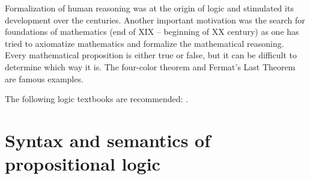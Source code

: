 \begin{page}
Formalization of human reasoning was at the origin of logic and stimulated its development over the centuries.
Another important motivation was the search for foundations of mathematics (end of XIX -- beginning of XX century)
as one has tried to axiomatize mathematics and formalize the mathematical reasoning.
Every mathematical proposition is either true or false, but it can be difficult to determine which way it is.
The four-color theorem and Fermat's Last Theorem are famous examples.

The following logic textbooks are recommended: \cite{Gallier, CL1, CL2, Dalen}.




\end{page}

\begin{page}
\setcounter{section}{1}
\setcounter{subsection}{1}
\setcounter{dfn}{0}
\label{portion:348}

\section{Syntax and semantics of propositional logic}

\end{page}

